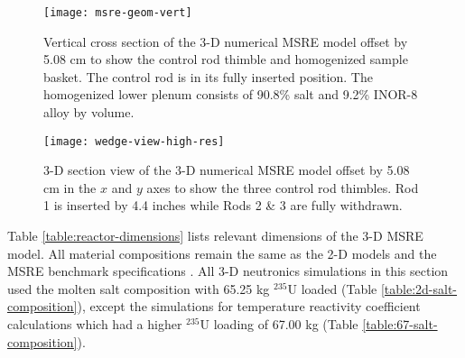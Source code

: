 \begin{figure}[p]
  \centering
  \texttt{[image: msre-geom-vert]}
  \caption{Vertical cross section of the 3-D numerical \gls{MSRE} model offset by 5.08 cm to show
  the control rod thimble and homogenized sample basket. The control rod is in its fully inserted
  position. The homogenized lower plenum consists of 90.8\% salt and 9.2\% INOR-8 alloy by volume.}
  \label{fig:msre-geom-vert}
\end{figure}

\begin{figure}[p]
  \centering
  \texttt{[image: wedge-view-high-res]}
  \caption{3-D section view of the 3-D numerical \gls{MSRE} model offset by 5.08 cm in the $x$ and
  $y$ axes to show the three control rod thimbles. Rod 1 is inserted by 4.4 inches while Rods 2 \&
  3 are fully withdrawn.}
  \label{fig:wedge-view}
\end{figure}

Table \ref{table:reactor-dimensions} lists relevant dimensions of the 3-D \gls{MSRE} model.
All material compositions remain
the same as the 2-D models and the \gls{MSRE} benchmark specifications \cite{fratoni_molten_2020}.
All 3-D neutronics simulations in this section used the molten salt composition with 65.25 kg
$^{235}$U loaded (Table \ref{table:2d-salt-composition}), except the simulations for temperature
reactivity coefficient calculations which had a higher $^{235}$U loading of 67.00 kg (Table
\ref{table:67-salt-composition}).

